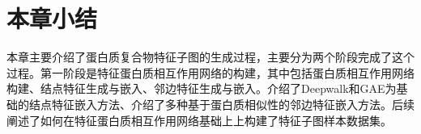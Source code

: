 \section{本章小结}
\label{section:FeatSubNetworkConstruct:summary}

本章主要介绍了蛋白质复合物特征子图的生成过程，主要分为两个阶段完成了这个过程。第一阶段是特征蛋白质相互作用网络的构建，其中包括蛋白质相互作用网络构建、结点特征生成与嵌入、邻边特征生成与嵌入。介绍了Deepwalk和GAE为基础的结点特征嵌入方法、介绍了多种基于蛋白质相似性的邻边特征嵌入方法。后续阐述了如何在特征蛋白质相互作用网络基础上上构建了特征子图样本数据集。

